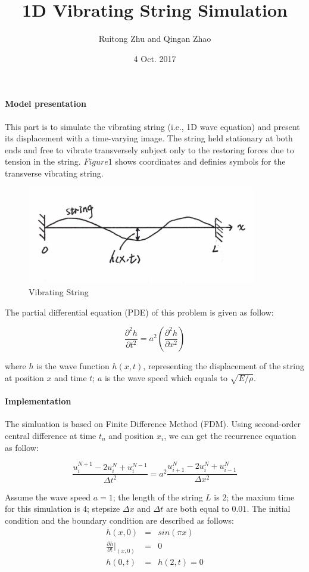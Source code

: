 \documentclass[11pt]{article}
\title{1D Vibrating String Simulation}
\date{4 Oct. 2017}
\author{Ruitong Zhu and Qingan Zhao}
\begin{document}
\paragraph{Model presentation}
This part is to simulate the vibrating string (i.e., 1D wave equation) and present its displacement with a time-varying image. The string held stationary at both ends and free to vibrate transversely subject only to the restoring forces due to tension in the string. $Figure 1$ shows coordinates and definies symbols for the transverse vibrating string. 

\begin{figure}[htb]
	\centering
	\includegraphics[width=10cm]{drawing.jpg}       
	\caption{Vibrating String}
\end{figure}

The partial differential equation (PDE) of this problem is given as follow:

\begin{equation}
	\frac{\partial^2 h}{\partial t^2}=a^2\left(\frac{\partial^2 h}{\partial x^2}\right)
\end{equation}

where $h$ is the wave function $h(x,t)$, representing the displacement of the string at position $x$ and time $t$; $a$ is the wave speed which equals to $\sqrt{E/\rho}$.

\paragraph{Implementation}

The simluation is based on Finite Difference Method (FDM). Using second-order central difference at time $t_n$ and position $x_i$, we can get the recurrence equation as follow:

\begin{equation}
\frac{u_{i}^{N+1}-2u_{i}^{N}+u_{i}^{N-1}}{\Delta t^2} = a^2\frac{u_{i+1}^{N}-2u_{i}^{N}+u_{i-1}^{N}}{\Delta x^2}
\end{equation}

Assume the wave speed $a = 1$; the length of the string $L$ is $2$; the maxium time for this simulation is $4$; stepsize $\Delta x$ and $\Delta t$ are both equal to $0.01$. The initial condition and the boundary condition are described as follows:
\begin{eqnarray}
h(x,0)&=&sin(\pi x)\\
\frac{\partial h}{\partial t}\bigg |_{(x,0)}&=&0\\
h(0,t)&=&h(2,t)=0
\end{eqnarray}
\end{document}
